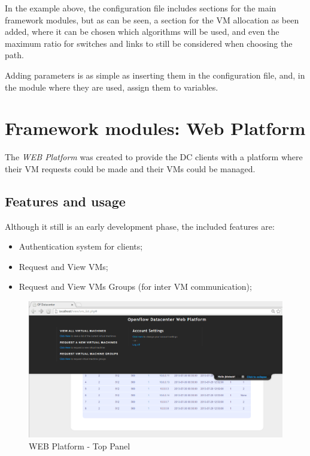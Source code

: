 \documentclass[12pt,english,oneside]{book}
\begin{document}
In the example above, the configuration file includes sections for the main framework modules, but as can be seen, a section for the VM allocation as been added, where it can be chosen which algorithms will be used, and even the maximum ratio for switches and links to still be considered when choosing the path.

Adding parameters is as simple as inserting them in the configuration file, and, in the module where they are used, assign them to variables.

\newpage

\section{Framework modules: Web Platform}
\hspace{0.6cm}

The \textit{WEB Platform} was created to provide the DC clients with a platform where their VM requests could be made and their VMs could be managed.

\subsection{Features and usage}
\hspace{0.6cm}

Although it still is an early development phase, the included features are:
\begin{itemize}
\item Authentication system for clients;
\item Request and View VMs;
\item Request and View VMs Groups (for inter VM communication);
\end{itemize}

\begin{figure}[h!tbp]
        \centering
        \includegraphics[width=1\textwidth]{figures/webplat_panel.png}
        \caption{WEB Platform - Top Panel}
        \label{fig:webplattop}
\end{figure}
\end{document}
